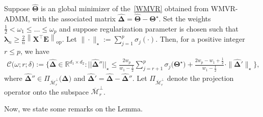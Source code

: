 \documentclass[alpha-refs]{wiley-article}
\begin{document}
\begin{lemma} \label{Cone_like_set}
Suppose $\widehat{\boldsymbol{\Theta}}$ is an global minimizer of the~\eqref{WMVR} obtained from WMVR-ADMM, with the associated matrix $\boldsymbol{\widehat{\Delta}} = \widehat{\boldsymbol{\Theta}}-\boldsymbol{\Theta^{\star}}$.
Set the weights $\frac{1}{2} < \omega_{1} \leq \dots \leq \omega_{p}$ and
suppose regularization parameter is chosen such that $\boldsymbol{\lambda}_{n}\geq\frac{2}{n}\left\| \boldsymbol{X}^{\top}\boldsymbol{E} \right\|_{\text{op}}$.
Let $\|\cdot\|_{\star}:=\sum_{j=1}^{p}\sigma_{j}(\cdot)$.
Then, for a positive integer $r\leq p$, we have
\begin{align} \label{cone_set}
    \mathcal{C}\big( \omega;r;\delta \big)
    := \bigg\{ \boldsymbol{\widehat{\Delta}}\in\mathbb{R}^{d_{1}\times d_{2}} :
    ||\boldsymbol{\widehat{\Delta}}''||_{\star} \leq \frac{2w_{p}}{w_{1}-\frac{1}{2}} \sum_{j=r+1}^{p}\sigma_{j}\big(\boldsymbol{\Theta^{\star}}\big)
    + \frac{2w_{p}-w_{1}+\frac{1}{2}}{w_{1}-\frac{1}{2}}\cdot \| \boldsymbol{\widehat{\Delta}}' \|_{\star} \bigg\},
\end{align}
where $\boldsymbol{\widehat{\Delta}}'' \in \Pi_{\overline{\mathcal{M}}_{r}^{\perp}}\big(\boldsymbol{\widehat{\Delta}}\big)$ and $\boldsymbol{\widehat{\Delta}}'=\boldsymbol{\widehat{\Delta}}-\boldsymbol{\widehat{\Delta}}''$.
Let $\Pi_{\overline{\mathcal{M}}_{r}^{\perp}}$ denote the projection operator onto the subspace $\overline{\mathcal{M}}_{r}^{\perp}$.
\end{lemma}
Now, we state some remarks on the Lemma.
\end{document}
